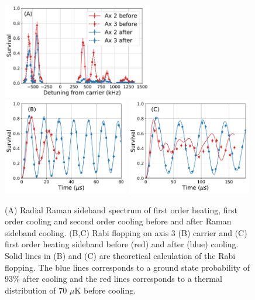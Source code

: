 \documentclass[aps,prl,twocolumn,groupedaddress]{revtex4-1}
\begin{document}
\begin{figure}
  \includegraphics[height=4.2cm]{imgs/spectrum_r.pdf}
  \includegraphics[height=4.2cm]{imgs/rabi_flop_r3_0.pdf}
  \includegraphics[height=4.2cm]{imgs/rabi_flop_r3_p1.pdf}
  \caption{(A) Radial Raman sideband spectrum of first order heating, first order cooling and
    second order cooling before and after Raman sideband cooling.
    (B,C) Rabi flopping on axis 3 (B) carrier and (C) first order heating sideband
    before (red) and after (blue) cooling.
    Solid lines in (B) and (C) are theoretical calculation of the Rabi flopping.
    The blue lines corresponds to a ground state probability of $93$\% after cooling and
    the red lines corresponds to a thermal distribution of $70$ $\mu$K before cooling.
    \label{f-radial}}
\end{figure}
\end{document}

